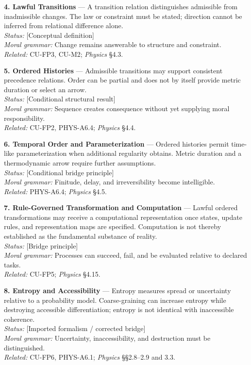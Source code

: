 \documentclass[
  11pt,
]{article}
\begin{document}
\textbf{4. Lawful Transitions} --- A transition relation distinguishes
admissible from inadmissible changes. The law or constraint must be
stated; direction cannot be inferred from relational difference alone.\\
\emph{Status:} {[}Conceptual definition{]}\\
\emph{Moral grammar:} Change remains answerable to structure and
constraint.\\
\emph{Related:} CU-FP3, CU-M2; \emph{Physics} §4.3.

\textbf{5. Ordered Histories} --- Admissible transitions may support
consistent precedence relations. Order can be partial and does not by
itself provide metric duration or select an arrow.\\
\emph{Status:} {[}Conditional structural result{]}\\
\emph{Moral grammar:} Sequence creates consequence without yet supplying
moral responsibility.\\
\emph{Related:} CU-FP2, PHYS-A6.4; \emph{Physics} §4.4.

\textbf{6. Temporal Order and Parameterization} --- Ordered histories
permit time-like parameterization when additional regularity obtains.
Metric duration and a thermodynamic arrow require further assumptions.\\
\emph{Status:} {[}Conditional bridge principle{]}\\
\emph{Moral grammar:} Finitude, delay, and irreversibility become
intelligible.\\
\emph{Related:} PHYS-A6.4; \emph{Physics} §4.5.

\textbf{7. Rule-Governed Transformation and Computation} --- Lawful
ordered transformations may receive a computational representation once
states, update rules, and representation maps are specified. Computation
is not thereby established as the fundamental substance of reality.\\
\emph{Status:} {[}Bridge principle{]}\\
\emph{Moral grammar:} Processes can succeed, fail, and be evaluated
relative to declared tasks.\\
\emph{Related:} CU-FP5; \emph{Physics} §4.15.

\textbf{8. Entropy and Accessibility} --- Entropy measures spread or
uncertainty relative to a probability model. Coarse-graining can
increase entropy while destroying accessible differentiation; entropy is
not identical with inaccessible coherence.\\
\emph{Status:} {[}Imported formalism / corrected bridge{]}\\
\emph{Moral grammar:} Uncertainty, inaccessibility, and destruction must
be distinguished.\\
\emph{Related:} CU-FP6, PHYS-A6.1; \emph{Physics} §§2.8--2.9 and 3.3.
\end{document}
